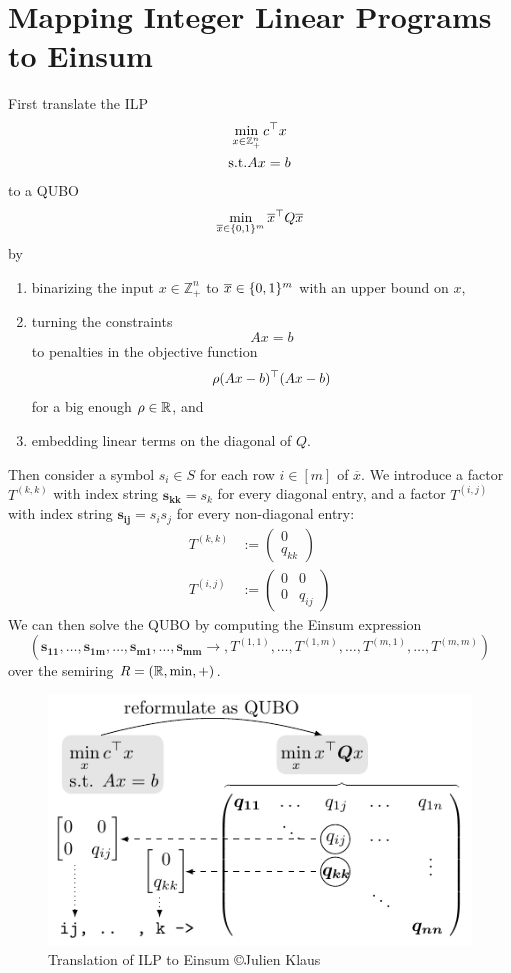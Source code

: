 \chapter{Mapping Integer Linear Programs to Einsum}
\label{chap:appendix:map_ilp}

First translate the ILP
\begin{gather*}
    \min_{x \in \mathbb{Z}_+^n} c^\top x\\
    \text{s.t.} Ax = b
\end{gather*}
to a QUBO
$$\min_{\overline{x} \in \lbrace 0,1 \rbrace^m} \overline{x}^\top Q \overline{x}$$
by
\begin{enumerate}[label={\arabic*.}]
    \item binarizing the input $x \in \mathbb{Z}_+^n$ to $\overline{x} \in \lbrace 0,1 \rbrace^m$ with an upper bound on $x$,
    \item turning the constraints $$Ax = b$$ to penalties in the objective function $$\rho (Ax - b)^\top (Ax - b)$$ for a big enough $\rho \in \mathbb{R}$, and
    \item embedding linear terms on the diagonal of $Q$.
\end{enumerate}

Then consider a symbol $s_i \in S$ for each row $i \in [m]$ of $\overline{x}$.
We introduce a factor $T^{(k, k)}$ with index string $\bm{s_{kk}} = s_k$ for every diagonal entry, and a factor $T^{(i,j)}$ with index string $\bm{s_{ij}} = s_i s_j$ for every non-diagonal entry:
\begin{align*}
    T^{(k, k)} & := \begin{pmatrix}
        0 \\
        q_{kk}
    \end{pmatrix} \\
    T^{(i,j)}  & := \begin{pmatrix}
        0 & 0      \\
        0 & q_{ij}
    \end{pmatrix}
\end{align*}
We can then solve the QUBO by computing the Einsum expression
$$(\bm{s_{11}}, \dots, \bm{s_{1m}}, \dots, \bm{s_{m1}}, \dots, \bm{s_{mm}} \rightarrow, T^{(1,1)}, \dots, T^{(1,m)}, \dots, T^{(m,1)}, \dots, T^{(m, m)})$$
over the semiring $R = (\mathbb{R}, \min, +)$.

\begin{figure}[h]
    \centering
    \includegraphics{graphics/ilp.pdf}
    \caption{Translation of ILP to Einsum \copyright Julien Klaus}
    \label{fig:appendix:map_ilp:ilp_to_einsum}
\end{figure}